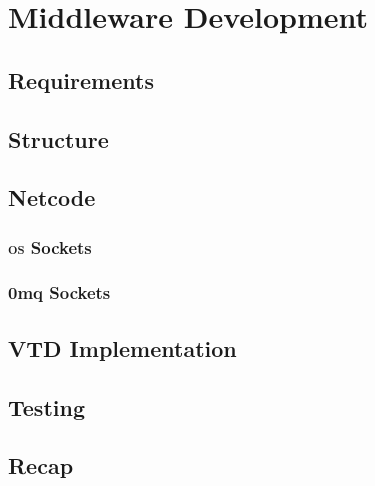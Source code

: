 \chapter{Middleware Development}\label{ch:middleware}

\section{Requirements}\label{sc:middleware:requirements}

\section{Structure}\label{sc:middleware:structure}

\section{Netcode}\label{sc:middleware:netcode}

\subsection{\textsc{os} Sockets}

\subsection{0mq Sockets}

\section{VTD Implementation}\label{sc:middleware:implementation}

\section{Testing}\label{sc:middleware:testing}

\section{Recap}\label{sc:middleware:recap}
